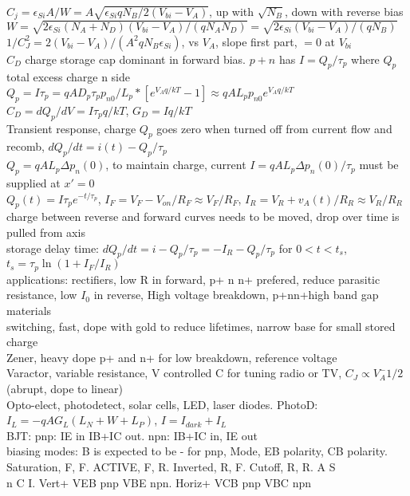 \documentclass{article}
\begin{document}
\begin{large}
\\$C_j=\epsilon_{Si}A/W=A\sqrt{\epsilon_{Si}qN_B/2(V_{bi}-V_A)}$, up with $\sqrt{N_B}$, down with reverse bias
\\$W=\sqrt{2\epsilon_{Si}(N_A+N_D)(V_{bi}-V_A)/(qN_AN_D)}=\sqrt{2\epsilon_{Si}(V_{bi}-V_A)/(qN_B)}$
\\$1/C_J^2=2(V_{bi}-V_A)/(A^2qN_B\epsilon_{Si})$, vs $V_A$, slope first part, $=0$ at $V_{bi}$
\\$C_D$ charge storage cap dominant in forward bias. $p+n$ has $I=Q_p/\tau_p$ where $Q_p$ total excess charge n side
\\$Q_p=I\tau_p=qAD_p\tau_pp_{n0}/L_p * [e^{V_A q/kT}-1]\approx qAL_pp_{n0}e^{V_A q/kT}$
\\$C_D=dQ_p/dV=I\tau_pq/kT$, $G_D=Iq/kT$
\\Transient response, charge $Q_p$ goes zero when turned off from current flow and recomb, $dQ_p/dt=i(t)-Q_p/\tau_p$
\\$Q_p=qAL_p\Delta p_n(0)$, to maintain charge, current $I=qAL_p\Delta p_n(0)/\tau_p$ must be supplied at $x'=0$
\\$Q_p(t)=I\tau_pe^{-t/\tau_p}$, $I_F=V_F-V_{on}/R_F\approx V_F/R_F$, $I_R=V_R+v_A(t)/R_R\approx V_R/R_R$
\\charge between reverse and forward curves needs to be moved, drop over time is pulled from axis
\\storage delay time: $dQ_p/dt=i-Q_p/\tau_p=-I_R-Q_p/\tau_p$ for $0<t<t_s$, $t_s=\tau_p\ln(1+I_F/I_R)$
\\applications: rectifiers, low R in forward, p+ n n+ prefered, reduce parasitic resistance, low $I_0$ in reverse, High voltage breakdown, p+nn+high band gap materials
\\switching, fast, dope with gold to reduce lifetimes, narrow base for small stored charge
\\Zener, heavy dope p+ and n+ for low breakdown, reference voltage
\\Varactor, variable resistance, V controlled C for tuning radio or TV, $C_J\propto V_A^-1/2$ (abrupt, dope to linear)
\\Opto-elect, photodetect, solar cells, LED, laser diodes. PhotoD: $I_L=-qAG_L(L_N+W+L_P)$, $I=I_{dark}+I_L$
\\BJT: pnp: IE in IB+IC out. npn: IB+IC in, IE out
\\biasing modes: B is expected to be - for pnp, Mode, EB polarity, CB polarity. Saturation, F, F. ACTIVE, F, R. Inverted, R, F. Cutoff, R, R. A S \\n C I. Vert+ VEB pnp VBE npn. Horiz+ VCB pnp VBC npn

\end{large}
\end{document}
